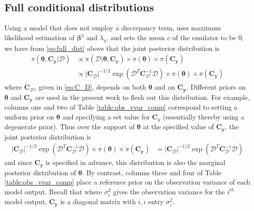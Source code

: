 \documentclass{article}
\begin{document}
\begin{appendices}

\section{Full conditional distributions}
Using a model that does not employ a discrepancy term, uses maximum likelihood estimation of $\boldsymbol \beta^\eta$ and $\lambda_\eta$, and sets the mean $c$ of the emulator to be 0, we have from \eqref{eq:full_dist} above that the joint posterior distribution is
\begin{equation}
\begin{aligned}
\pi(\boldsymbol\theta,\mathbf C_{\mathbf y} | \mathcal D) &\propto
\pi(\mathcal D|\boldsymbol\theta,\mathbf C_{\mathbf y}) \times \pi(\boldsymbol\theta) \times \pi(\mathbf C_{\mathbf y})\\
&\propto \lvert \mathbf C_{\mathcal D} \rvert ^{-1/2} \exp (\mathcal D^T \mathbf C_{\mathcal D}^{-1}\mathcal D) \times \pi(\boldsymbol \theta) \times \pi(\mathbf C_{\mathbf y})
\end{aligned}
\end{equation}
where $\mathbf C_{\mathcal D}$, given in \eqref{eq:C_D}, depends on both $\boldsymbol\theta$ and on $\mathbf C_{\mathbf y}$.
Different priors on $\boldsymbol\theta$ and $\mathbf C_{\mathbf y}$ are used in the present work to flesh out this distribution. 
For example, columns one and two of Table \ref{table:obs_vvar_comp} correspond to setting a uniform prior on $\boldsymbol\theta$ and specifying a set value for $\mathbf C_y$ (essentially thereby using a degenerate prior). 
Thus over the support of $\boldsymbol \theta$ at the specified value of $\mathbf C_{\mathbf y}$, the joint posterior distribution is
\begin{equation}\label{eq:fdupup}
\begin{aligned}
\lvert \mathbf C_{\mathcal D} \rvert ^{-1/2} \exp (\mathcal D^T \mathbf C_{\mathcal D}^{-1}\mathcal D) \times \pi(\boldsymbol \theta) \times \pi(\mathbf C_{\mathbf y}) &=\lvert \mathbf C_{\mathcal D} \rvert ^{-1/2} \exp (\mathcal D^T \mathbf C_{\mathcal D}^{-1}\mathcal D)
\end{aligned}
\end{equation}
and since $\mathbf C_{\mathbf y}$ is specified in advance, this distribution is also the marginal posterior distribution of $\boldsymbol\theta$. 
By contrast, columns three and four of Table \ref{table:obs_vvar_comp} place a reference prior on the observation variance of each model output. Recall that where $\sigma^2_i$ gives the observation variance for the $i^{th}$ model output, $\mathbf C_{\mathbf y}$ is a diagonal matrix with $i,i$ entry $\sigma^2_i$. 

\end{appendices}
\end{document}
